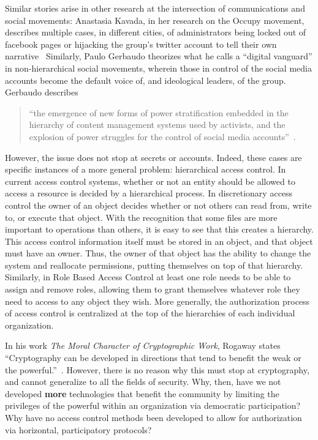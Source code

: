 Similar stories arise in other research at the intersection of communications
and social movements: Anastasia Kavada, in her research on the Occupy movement,
describes multiple cases, in different cities, of administrators being locked
out of facebook pages or hijacking the group’s twitter account to tell their own
narrative~\cite{kavada2015creating} Similarly, Paulo Gerbaudo theorizes what he
calls a ``digital vanguard'' in non-hierarchical social movements, wherein those
in control of the social media accounts become the default voice of, and
ideological leaders, of the group. Gerbaudo describes 

\begin{quote}
``the emergence of new forms of power stratification embedded in the hierarchy
of content management systems used by activists, and the explosion of power
struggles for the control of social media accounts''~\cite{gerbaudo2017social}.
\end{quote}

However, the issue does not stop at secrets or accounts. Indeed, these cases are
specific instances of a more general problem: hierarchical access control. In
current access control systems, whether or not an entity should be allowed to
access a resource is decided by a hierarchical process. In discretionary access
control the owner of an object decides whether or not others can read from,
write to, or execute that object. With the recognition that some files are more
important to operations than others, it is easy to see that this creates a
hierarchy. This access control information itself must be stored in an object,
and that object must have an owner. Thus, the owner of that object has the
ability to change the system and reallocate permissions, putting themselves on
top of that hierarchy. Similarly, in Role Based Access Control at least one role
needs to be able to assign and remove roles, allowing them to grant themselves
whatever role they need to access to any object they wish. More generally, the
authorization process of access control is centralized at the top of the
hierarchies of each individual organization.

In his work \textit{The Moral Character of Cryptographic Work}, Rogaway states
``Cryptography can be developed in directions that tend to benefit the weak or
the powerful.''~\cite{rogaway2015moral}. However, there is no reason why this
must stop at cryptography, and cannot generalize to all the fields of security.
Why, then, have we not developed \textbf{more} technologies that benefit the
community by limiting the privileges of the powerful within an organization via
democratic participation? Why have no access control methods been developed to
allow for authorization via horizontal, participatory protocols?

